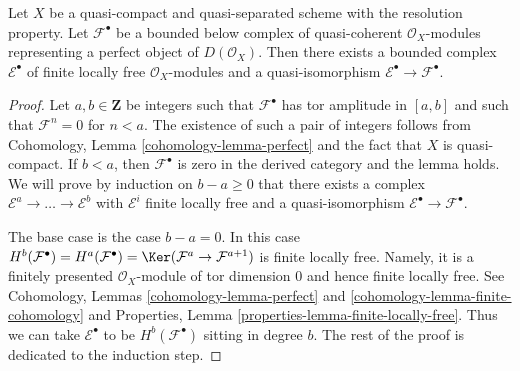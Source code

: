 \begin{lemma}
\label{lemma-construct-strictly-perfect}
Let $X$ be a quasi-compact and quasi-separated scheme with the
resolution property.
Let $\mathcal{F}^\bullet$ be a bounded below complex of quasi-coherent
$\mathcal{O}_X$-modules representing a perfect object of
$D(\mathcal{O}_X)$. Then there exists a bounded complex
$\mathcal{E}^\bullet$ of finite locally free $\mathcal{O}_X$-modules
and a quasi-isomorphism $\mathcal{E}^\bullet \to \mathcal{F}^\bullet$.
\end{lemma}

\begin{proof}
Let $a, b \in \mathbf{Z}$ be integers such that $\mathcal{F}^\bullet$
has tor amplitude in $[a, b]$ and such that $\mathcal{F}^n = 0$ for
$n < a$. The existence of such a pair of integers
follows from Cohomology, Lemma \ref{cohomology-lemma-perfect}
and the fact that $X$ is quasi-compact.
If $b < a$, then $\mathcal{F}^\bullet$ is zero in the
derived category and the lemma holds.
We will prove by induction on
$b - a \geq 0$ that there exists a complex
$\mathcal{E}^a \to \ldots \to \mathcal{E}^b$
with $\mathcal{E}^i$ finite locally free
and a quasi-isomorphism $\mathcal{E}^\bullet \to \mathcal{F}^\bullet$.

\medskip\noindent
The base case is the case $b - a = 0$. In this case
$H^b(\mathcal{F}^\bullet) = H^a(\mathcal{F}^\bullet) =
\Ker(\mathcal{F}^a \to \mathcal{F}^{a + 1})$
is finite locally free. Namely, it is a finitely presented
$\mathcal{O}_X$-module of tor dimension $0$ and hence finite
locally free. See Cohomology, Lemmas \ref{cohomology-lemma-perfect} and
\ref{cohomology-lemma-finite-cohomology} and
Properties, Lemma \ref{properties-lemma-finite-locally-free}.
Thus we can take $\mathcal{E}^\bullet$ to be
$H^b(\mathcal{F}^\bullet)$ sitting in degree $b$.
The rest of the proof is dedicated to the induction step.


\end{proof}

